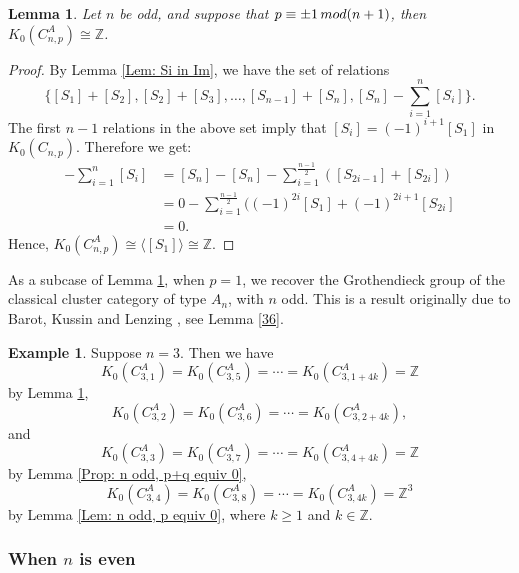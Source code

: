 \documentclass[a4paper,reqno,11pt]{amsart}
\newtheorem{lemma}[theorem]{Lemma}
\theoremstyle{definition}
\newtheorem{example}[theorem]{Example}
\renewcommand{\mod}{\mathop{\rm mod}\nolimits}%
\begin{document}

\begin{lemma}\label{Lem: n odd, p equiv 1}
	Let $n$ be odd, and suppose that $p \equiv \pm 1 \mod (n+1)$, then $K_0(C_{n,p}^A) \cong \mathbb{Z}$.
\end{lemma}

\begin{proof}
	By Lemma \ref{Lem: Si in Im}, we have the set of relations
	\[
	\{[S_1] + [S_2], [S_2] + [S_3], \ldots, [S_{n-1}] + [S_n], [S_n] - \sum_{i=1}^n [S_i]\}.
	\]
	The first $n-1$ relations in the above set imply that $[S_i] = (-1)^{i+1}[S_1]$ in $K_0(C_{n,p})$.
	Therefore we get:
	\begin{align*}
		[S_n] - \sum_{i=1}^n [S_i] &= [S_n] - [S_n] - \sum_{i=1}^{\frac{n-1}{2}} ([S_{2i-1}] +[S_{2i}])\\
		&= 0- \sum_{i=1}^{\frac{n-1}{2}} ((-1)^{2i}[S_1] + (-1)^{2i+1} [S_{2i}]\\
		&=0.
	\end{align*}
	Hence, 	$K_0(C_{n,p}^A) \cong \langle [S_1] \rangle \cong \mathbb{Z}$.
\end{proof}

As a subcase of Lemma \ref{Lem: n odd, p equiv 1}, when $p=1$, we recover the Grothendieck group of the classical cluster category of type $A_n$, with $n$ odd.
This is a result originally due to Barot, Kussin and Lenzing \cite{BKL}, see Lemma \ref{36}.

\begin{example}
Suppose $n=3$. Then we have
$$K_0(C_{3,1}^A)=K_0(C_{3,5}^A)=\cdots=K_0(C_{3,1+4k}^A)=\mathbb{Z}$$
by Lemma \ref{Lem: n odd, p equiv 1},
$$K_0(C_{3,2}^A)=K_0(C_{3,6}^A)=\cdots=K_0(C_{3,2+4k}^A), $$
and
$$K_0(C_{3,3}^A)=K_0(C_{3,7}^A)=\cdots=K_0(C_{3,4+4k}^A)=\mathbb{Z}$$
by Lemma \ref{Prop: n odd, p+q equiv 0},
$$K_0(C_{3,4}^A)=K_0(C_{3,8}^A)=\cdots=K_0(C_{3,4k}^A)=\mathbb{Z}^3$$
by Lemma \ref{Lem: n odd, p equiv 0},
where $k\geq 1$ and $k\in\mathbb{Z}$.
\end{example}


\subsubsection{When $n$ is even}
\end{document}
